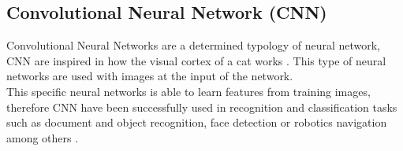 

\subsection{Convolutional Neural Network (CNN)}
Convolutional Neural Networks are a determined typology of neural network, CNN are inspired in how the visual cortex of a cat works \cite{Doorn}. This type of neural networks are used with images at the input of the network.\\

This specific neural networks is able to learn features from training images, therefore CNN have been successfully used in recognition and classification tasks such as document and object recognition, face detection or robotics navigation among others \cite{Lecum2, Lecum3}.
